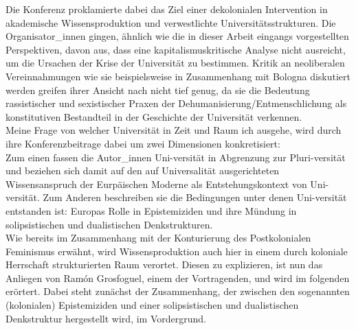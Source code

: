 \noindent Die Konferenz proklamierte dabei das Ziel einer dekolonialen
Intervention in akademische Wissensproduktion und verwestlichte
Universitätsstrukturen. Die Organisator\_innen gingen, ähnlich wie die in dieser
Arbeit eingangs vorgestellten Perspektiven, davon aus, dass eine
kapitalismuskritische Analyse nicht ausreicht, um die Ursachen der Krise der
Universität zu bestimmen. Kritik an neoliberalen Vereinnahmungen wie sie
beispielsweise in Zusammenhang mit Bologna diskutiert werden \footnotemark
{} greifen ihrer
Ansicht nach nicht tief genug, da sie die Bedeutung rassistischer und
sexistischer Praxen der Dehumanisierung/Entmenschlichung als konstitutiven
Bestandteil in der Geschichte der Universität verkennen.\\

\noindent Meine Frage von
welcher Universität in Zeit und Raum ich ausgehe, wird durch ihre
Konferenzbeitrage dabei um zwei Dimensionen konkretisiert:\\
 Zum einen fassen die
Autor\_innen Uni-versität in Abgrenzung zur Pluri-versität und beziehen sich
damit auf den auf Universalität ausgerichteten Wissensanspruch der Eurpäischen
Moderne als Entstehungskontext von Uni-versität. Zum Anderen beschreiben sie
die Bedingungen unter denen Uni-versität entstanden ist: Europas Rolle in
Epistemiziden und ihre Mündung in solipsistischen und dualistischen
Denkstrukturen. \\
Wie bereits im Zusammenhang mit der Konturierung des
Postkolonialen Feminismus erwähnt, wird Wissensproduktion auch hier in einem
durch koloniale Herrschaft strukturierten Raum verortet. Diesen zu explizieren,
ist nun das Anliegen von Ramón Grosfoguel, einem der Vortragenden, und wird im
folgenden erörtert. \footnotemark {} Dabei steht zunächst der Zusammenhang, der zwischen
den sogenannten (kolonialen) Epistemiziden und einer solipsistischen und
dualistischen Denkstruktur hergestellt wird, im Vordergrund.\\ 

